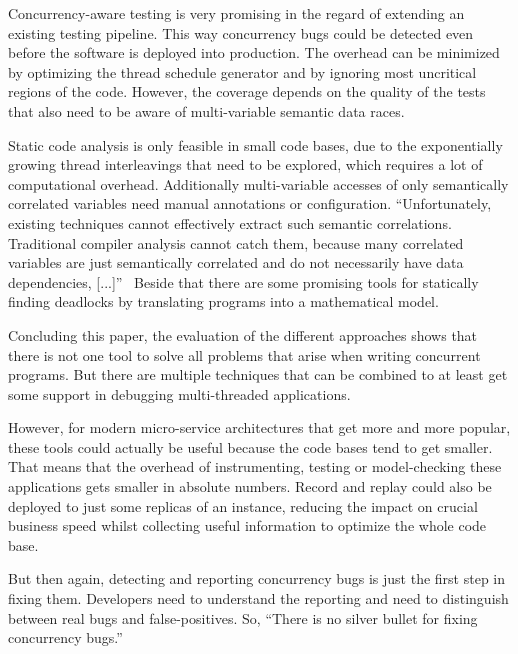 \documentclass[conference]{IEEEtran}
\begin{document}
Concurrency-aware testing is very promising in the regard of extending an existing testing pipeline.
This way concurrency bugs could be detected even before the software is deployed into production.
The overhead can be minimized by optimizing the thread schedule generator and by ignoring most uncritical regions of the code.
However, the coverage depends on the quality of the tests that also need to be aware of multi-variable semantic data races.

Static code analysis is only feasible in small code bases, due to the exponentially growing thread interleavings that need to be explored, which requires a lot of computational overhead.
Additionally multi-variable accesses of only semantically correlated variables need manual annotations or configuration.
``Unfortunately, existing techniques cannot effectively extract such semantic correlations. Traditional compiler analysis cannot catch them, because many correlated variables are just semantically correlated and do not necessarily have data dependencies, [...]''~\cite{lu2007muvi}
Beside that there are some promising tools for statically finding deadlocks by translating programs into a mathematical model.

Concluding this paper, the evaluation of the different approaches shows that there is not one tool to solve all problems that arise when writing concurrent programs.
But there are multiple techniques that can be combined to at least get some support in debugging multi-threaded applications.

However, for modern micro-service architectures that get more and more popular, these tools could actually be useful because the code bases tend to get smaller.
That means that the overhead of instrumenting, testing or model-checking these applications gets smaller in absolute numbers.
Record and replay could also be deployed to just some replicas of an instance, reducing the impact on crucial business speed whilst collecting useful information to optimize the whole code base.

But then again, detecting and reporting concurrency bugs is just the first step in fixing them.
Developers need to understand the reporting and need to distinguish between real bugs and false-positives.
So, ``There is no silver bullet for fixing concurrency bugs.''~\cite{lu2008mistakes}




\end{document}
